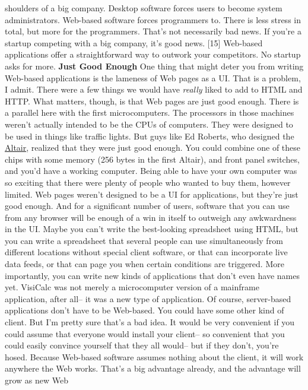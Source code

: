 shoulders of a big company.
Desktop software forces users to become system administrators.
Web-based software forces programmers to.  There is less stress in
total, but more for the programmers.  That's not necessarily bad
news.  If you're a startup competing with a big company, it's good
news. [15]  Web-based applications offer a straightforward way to
outwork your competitors.  No startup asks for more.
\textbf{Just Good Enough}
One thing that might deter you from writing Web-based applications
is the lameness of Web pages as a UI.  That is a problem, I admit.
There were a few things we would have \emph{really} liked to add to
HTML and HTTP.  What matters, though, is that Web pages are just
good enough.
There is a parallel here with the first microcomputers.  The
processors in those machines weren't actually intended to be the
CPUs of computers.  They were designed to be used in things like
traffic lights.  But guys like Ed Roberts, who designed the 
\href{http://en.wikipedia.org/wiki/Altair\_8800}{Altair},
realized that they were just good enough.  You could combine one
of these chips with some memory (256 bytes in the first Altair),
and front panel switches, and you'd have a working computer.  Being
able to have your own computer was so exciting that there were
plenty of people who wanted to buy them, however limited.
Web pages weren't designed to be a UI for applications, but they're
just good enough.  And for a significant number of users, software
that you can use from any browser will be enough of a win in itself
to outweigh any awkwardness in the UI.  Maybe you can't write the
best-looking spreadsheet using HTML, but you can write a spreadsheet
that several people can use simultaneously from different locations
without special client software, or that can incorporate live data
feeds, or that can page you when certain conditions are triggered.
More importantly, you can write new kinds of applications that
don't even have names yet.  VisiCalc was not merely a microcomputer
version of a mainframe application, after all-- it was a new type
of application.
Of course, server-based applications don't have to be Web-based.
You could have some other kind of client.  But I'm pretty sure
that's a bad idea.  It would be very convenient if you could assume
that everyone would install your client-- so convenient that you
could easily convince yourself that they all would-- but if they
don't, you're hosed.  Because Web-based software assumes nothing
about the client, it will work anywhere the Web works.  That's a
big advantage already, and the advantage will grow as new Web
